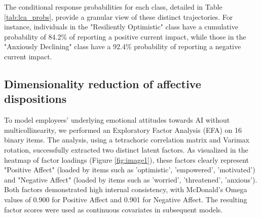\documentclass[]{article}
\begin{document}
The conditional response probabilities for each class, detailed in Table \ref{tab:lca_probs}, provide a granular view of these distinct trajectories. For instance, individuals in the "Resiliently Optimistic" class have a cumulative probability of 84.2\% of reporting a positive current impact, while those in the "Anxiously Declining" class have a 92.4\% probability of reporting a negative current impact.

\begin{table}[t]
\centering
\caption{LCA Class Sizes and Conditional Response Probabilities for the 3-Class Solution.}
\label{tab:lca_probs}
\end{table}

\subsection{Dimensionality reduction of affective dispositions}
To model employees' underlying emotional attitudes towards AI without multicollinearity, we performed an Exploratory Factor Analysis (EFA) on 16 binary items. The analysis, using a tetrachoric correlation matrix and Varimax rotation, successfully extracted two distinct latent factors. As visualized in the heatmap of factor loadings (Figure \ref{fig:image1}), these factors clearly represent "Positive Affect" (loaded by items such as 'optimistic', 'empowered', 'motivated') and "Negative Affect" (loaded by items such as 'worried', 'threatened', 'anxious'). Both factors demonstrated high internal consistency, with McDonald's Omega values of 0.900 for Positive Affect and 0.901 for Negative Affect. The resulting factor scores were used as continuous covariates in subsequent models.
\end{document}
